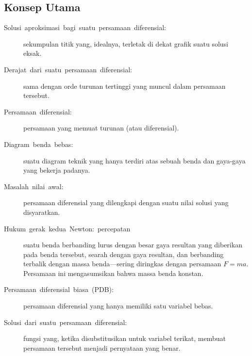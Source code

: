 \subsection{Konsep Utama}
\begin{description}
\item [{Solusi\ aproksimasi\ bagi\ suatu\ persamaan\ diferensial:}] sekumpulan
titik yang, idealnya, terletak di dekat grafik suatu solusi eksak.
\item [{Derajat\ dari\ suatu\ persamaan\ diferensial:}] sama dengan
orde turunan tertinggi yang muncul dalam persamaan tersebut.
\item [{Persamaan\ diferensial:}] persamaan yang memuat turunan (atau
diferensial).
\item [{Diagram\ benda\ bebas:}] suatu diagram teknik yang hanya terdiri
atas sebuah benda dan gaya-gaya yang bekerja padanya.
\item [{Masalah\ nilai\ awal:}] persamaan diferensial yang dilengkapi
dengan suatu nilai solusi yang disyaratkan.
\item [{Hukum\ gerak\ kedua\ Newton:\ percepatan}] suatu benda berbanding
lurus dengan besar gaya resultan yang diberikan pada benda tersebut,
searah dengan gaya resultan, dan berbanding terbalik dengan massa
benda---sering diringkas dengan persamaan $F=ma$. Persamaan ini
mengasumsikan bahwa massa benda konstan.
\item [{Persamaan\ diferensial\ biasa\ (PDB):}] persamaan diferensial
yang hanya memiliki satu variabel bebas.
\item [{Solusi\ dari\ suatu\ persamaan\ diferensial:}] fungsi yang,
ketika disubstitusikan untuk variabel terikat, membuat persamaan tersebut
menjadi pernyataan yang benar.
\end{description}
\startexercises 

